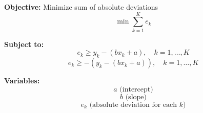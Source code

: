 \documentclass{article}
\begin{document}
\textbf{Objective:} Minimize sum of absolute deviations
\[
\min \sum_{k=1}^{K} e_k
\]

\textbf{Subject to:}
\[
e_k \geq y_k - (bx_k + a), \quad k = 1, \ldots, K
\]
\[
e_k \geq -(y_k - (bx_k + a)), \quad k = 1, \ldots, K
\]

\textbf{Variables:}
\[
a \text{ (intercept)}
\]
\[
b \text{ (slope)}
\]
\[
e_k \text{ (absolute deviation for each } k \text{)}
\]
\end{document}
